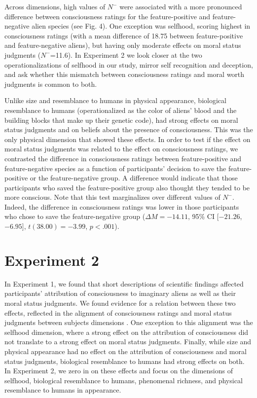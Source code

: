 \documentclass[10pt, letterpaper]{article}
\begin{document}
Across dimensions, high values of \(N^-\) were associated with a more
pronounced difference between consciousness ratings for the
feature-positive and feature-negative alien species (see Fig. 4). One
exception was selfhood, scoring highest in consciousness ratings (with a
mean difference of 18.75 between feature-positive and feature-negative
aliens), but having only moderate effects on moral status judgments
(\(N^-\)=11.6). In Experiment 2 we look closer at the two
operationalizations of selfhood in our study, mirror self recognition
and deception, and ask whether this mismatch between consciousness
ratings and moral worth judgments is common to both.

Unlike size and resemblance to humans in physical appearance, biological
resemblance to humans (operationalized as the color of aliens' blood and
the building blocks that make up their genetic code), had strong effects
on moral status judgments and on beliefs about the presence of
consciousness. This was the only physical dimension that showed these
effects. In order to test if the effect on moral status judgments was
related to the effect on consciousness ratings, we contrasted the
difference in consciousness ratings between feature-positive and
feature-negative species as a function of participants' decision to save
the feature-positive or the feature-negative group. A difference would
indicate that those participants who saved the feature-positive group
also thought they tended to be more conscious. Note that this test
marginalizes over different values of \(N^-\). Indeed, the difference in
consciousness ratings was lower in those participants who chose to save
the feature-negative group (\(\Delta M = -14.11\), 95\% CI \([-21.26\),
\(-6.95]\), \(t(38.00) = -3.99\), \(p < .001\)).

\hypertarget{experiment-2}{%
\section{Experiment 2}\label{experiment-2}}

In Experiment 1, we found that short descriptions of scientific findings
affected participants' attribution of consciousness to imaginary aliens
as well as their moral status judgments. We found evidence for a
relation between these two effects, reflected in the alignment of
consciousness ratings and moral status judgments between subjects
dimensions . One exception to this alignment was the selfhood dimension,
where a strong effect on the attribution of consciousness did not
translate to a strong effect on moral status judgments. Finally, while
size and physical appearance had no effect on the attribution of
consciousness and moral status judgments, biological resemblance to
humans had strong effects on both. In Experiment 2, we zero in on these
effects and focus on the dimensions of selfhood, biological resemblance
to humans, phenomenal richness, and physical resemblance to humans in
appearance.
\end{document}
